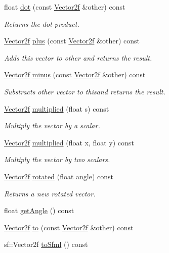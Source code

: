 \begin{DoxyCompactItemize}
float \hyperlink{classzt_1_1_vector2f_a8141042fa92a5138e5d435505882d122}{dot} (const \hyperlink{classzt_1_1_vector2f}{Vector2f} \&other) const
\begin{DoxyCompactList}\small\item\em Returns the dot product. \end{DoxyCompactList}\item 
\hyperlink{classzt_1_1_vector2f}{Vector2f} \hyperlink{classzt_1_1_vector2f_a9455159e20935fee1c3fd46d5c138caa}{plus} (const \hyperlink{classzt_1_1_vector2f}{Vector2f} \&other) const
\begin{DoxyCompactList}\small\item\em Adds this vector to other and returns the result. \end{DoxyCompactList}\item 
\hyperlink{classzt_1_1_vector2f}{Vector2f} \hyperlink{classzt_1_1_vector2f_a69478760accc84d5de3867c899499f3a}{minus} (const \hyperlink{classzt_1_1_vector2f}{Vector2f} \&other) const
\begin{DoxyCompactList}\small\item\em Substracts other vector to thisand returns the result. \end{DoxyCompactList}\item 
\hyperlink{classzt_1_1_vector2f}{Vector2f} \hyperlink{classzt_1_1_vector2f_a158fe50fd17f2a0ee72a6add6a33ae93}{multiplied} (float s) const
\begin{DoxyCompactList}\small\item\em Multiply the vector by a scalar. \end{DoxyCompactList}\item 
\hyperlink{classzt_1_1_vector2f}{Vector2f} \hyperlink{classzt_1_1_vector2f_aadee7c951439eb7953256e5f5704e28a}{multiplied} (float x, float y) const
\begin{DoxyCompactList}\small\item\em Multiply the vector by two scalars. \end{DoxyCompactList}\item 
\hyperlink{classzt_1_1_vector2f}{Vector2f} \hyperlink{classzt_1_1_vector2f_a1b301634478a665f0e0e7cacdc568cac}{rotated} (float angle) const
\begin{DoxyCompactList}\small\item\em Returns a new rotated vector. \end{DoxyCompactList}\item 
float \hyperlink{classzt_1_1_vector2f_a4449e55fef14e503d832831b97d2f949}{get\+Angle} () const
\item 
\hyperlink{classzt_1_1_vector2f}{Vector2f} \hyperlink{classzt_1_1_vector2f_a2aa1ef32f78d6399891f6318e9a0cd3c}{to} (const \hyperlink{classzt_1_1_vector2f}{Vector2f} \&other) const
\item 
sf\+::\+Vector2f \hyperlink{classzt_1_1_vector2f_aebb473f59fd05176a89031cad7b5e13a}{to\+Sfml} () const
\end{DoxyCompactItemize}


